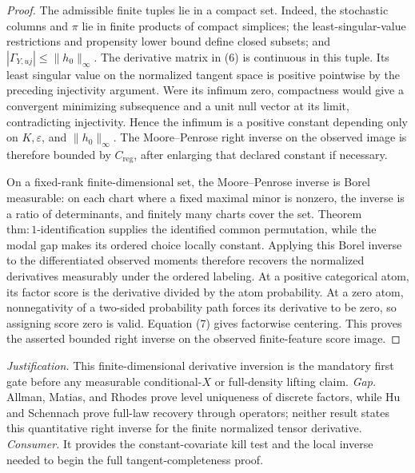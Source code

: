\documentclass{article}
\begin{document}
\begin{proof}
The admissible finite tuples lie in a compact set.  Indeed, the stochastic columns and \(\pi\) lie in finite products of compact simplices; the least-singular-value restrictions and propensity lower bound define closed subsets; and \(|\Gamma_{Y,uj}|\leq\|h_0\|_\infty\).  The derivative matrix in (6) is continuous in this tuple.  Its least singular value on the normalized tangent space is positive pointwise by the preceding injectivity argument.  Were its infimum zero, compactness would give a convergent minimizing subsequence and a unit null vector at its limit, contradicting injectivity.  Hence the infimum is a positive constant depending only on \(K,\varepsilon\), and \(\|h_0\|_\infty\).  The Moore--Penrose right inverse on the observed image is therefore bounded by \(C_{\mathrm{reg}}\), after enlarging that declared constant if necessary.

On a fixed-rank finite-dimensional set, the Moore--Penrose inverse is Borel measurable: on each chart where a fixed maximal minor is nonzero, the inverse is a ratio of determinants, and finitely many charts cover the set.  Theorem \(\mathrm{thm{:}1\mbox{-}identification}\) supplies the identified common permutation, while the modal gap makes its ordered choice locally constant.  Applying this Borel inverse to the differentiated observed moments therefore recovers the normalized derivatives measurably under the ordered labeling.  At a positive categorical atom, its factor score is the derivative divided by the atom probability.  At a zero atom, nonnegativity of a two-sided probability path forces its derivative to be zero, so assigning score zero is valid.  Equation (7) gives factorwise centering.  This proves the asserted bounded right inverse on the observed finite-feature score image.
\end{proof}
\par\smallskip\noindent \textit{Justification.} This finite-dimensional derivative inversion is the mandatory first gate before any measurable conditional-\(X\) or full-density lifting claim. \textit{Gap.} Allman, Matias, and Rhodes prove level uniqueness of discrete factors, while Hu and Schennach prove full-law recovery through operators; neither result states this quantitative right inverse for the finite normalized tensor derivative. \textit{Consumer.} It provides the constant-covariate kill test and the local inverse needed to begin the full tangent-completeness proof.
\end{document}
